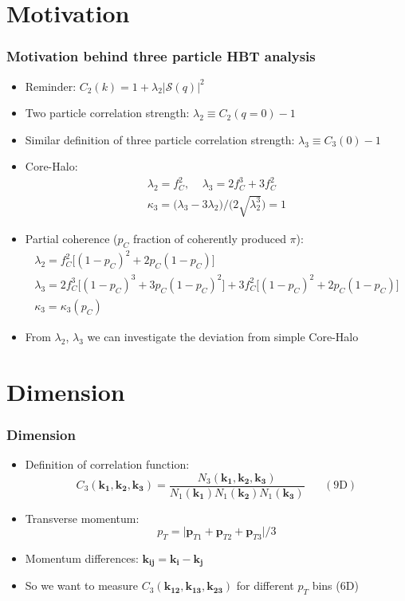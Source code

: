 \documentclass{beamer}
\begin{document}
\section{Motivation}
\begin{frame}
\frametitle{Motivation behind three particle HBT analysis}
\begin{itemize}
\setlength{\itemsep}{10pt}
\item Reminder: $C_2(k) = 1 + \lambda_2 |\mathcal{S}(q)|^2$
\item Two particle correlation strength: $\lambda_2 \equiv C_2(q=0)-1$
\item Similar definition of three particle correlation strength: $\lambda_3 \equiv C_3(0)-1$
\item Core-Halo: \vspace*{-15pt}
	\begin{align*}
		\lambda_2=f_C^2,\;\;\;\;\lambda_3 = 2f_C^3+3f_C^2 \\ 
		\kappa_3=\big(\lambda_3-3\lambda_2\big)/\big(2\sqrt{\lambda_2^3}\big)=1
	\end{align*}
\item Partial coherence ($p_C$ fraction of coherently produced $\pi$): 
	\begin{gather*}
		\lambda_2=f_C^2\big[(1-p_C)^2+2p_C(1-p_C)\big]\\
		\lambda_3=2f_C^3\big[(1-p_C)^3+3p_C(1-p_C)^2\big]+3f_C^2\big[(1-p_C)^2+2p_C(1-p_C)\big]\nonumber\\
		\kappa_3 = \kappa_3(p_C)
	\end{gather*}
\item From $\lambda_2$, $\lambda_3$ we can investigate the deviation from simple Core-Halo
\end{itemize}
\end{frame}

\section{Dimension}
\begin{frame}
\frametitle{Dimension}
\begin{itemize}
\setlength{\itemsep}{12pt}
\item Definition of correlation function:
\begin{equation}
C_3(\bm{k_1}, \bm{k_2}, \bm{k_3})=\frac{N_3(\bm{k_1}, \bm{k_2}, \bm{k_3})}{N_1(\bm{k_1})N_1(\bm{k_2})N_1(\bm{k_3})}\;\;\;\;\;\; \mathrm{(9D)} \label{eq:e1}
\end{equation}
\item Transverse momentum:
\begin{equation}
p_T=\big|\bm{p}_{T1}+\bm{p}_{T2}+\bm{p}_{T3}\big|/3
\end{equation}
\item Momentum differences: $\bm{k_{ij}}=\bm{k_i}-\bm{k_j}$
\item So we want to measure $C_3(\bm{k_{12}}, \bm{k_{13}}, \bm{k_{23}})$ for different $p_T$ bins (6D)
\end{itemize}
\end{frame}
\end{document}
